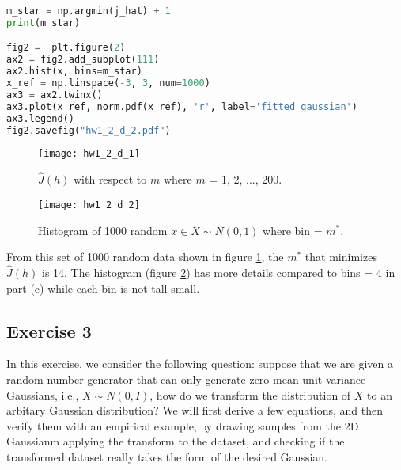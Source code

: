 \documentclass[11pt]{article}
\begin{document}
\begin{enumerate}[label=(\alph*)]
\begin{lstlisting}[language=Python, showstringspaces=false]
m_star = np.argmin(j_hat) + 1
print(m_star)

fig2 =  plt.figure(2)
ax2 = fig2.add_subplot(111)
ax2.hist(x, bins=m_star)
x_ref = np.linspace(-3, 3, num=1000)
ax3 = ax2.twinx()
ax3.plot(x_ref, norm.pdf(x_ref), 'r', label='fitted gaussian')
ax3.legend()
fig2.savefig("hw1_2_d_2.pdf")
\end{lstlisting}

\begin{figure}[H]
\centering
\texttt{[image: hw1\_2\_d\_1]}
\caption{$\hat{J}(h)$ with respect to $m$ where $m$ = 1, 2, ..., 200.}
\label{fig: hw1_2_d_1}
\end{figure}

\begin{figure}[H]
\centering
\texttt{[image: hw1\_2\_d\_2]}
\caption{Histogram of 1000 random $x \in X \sim N(0,1)$ where bin = $m^*$.}
\label{fig: hw1_2_d_2}
\end{figure}

From this set of 1000 random data shown in figure  \ref{fig: hw1_2_d_1}, the $m^*$ that minimizes $\hat{J}(h)$ is 14. The histogram  (figure \ref{fig: hw1_2_d_2}) has more details compared to bins = 4 in part (c) while each bin is not tall small.

\end{enumerate}

\subsection*{Exercise 3}
In this exercise, we consider the following question: suppose that we are given a random number generator that can only generate zero-mean unit variance Gaussians, i.e., $X \sim N(0,I)$, how do we transform the distribution of $X$ to an arbitary Gaussian distribution? 
We will first derive a few equations, and then verify them with an empirical example, by drawing samples from the 2D Gaussianm applying the transform to the dataset, and checking if the transformed dataset really takes the form of the desired Gaussian.
\end{document}

